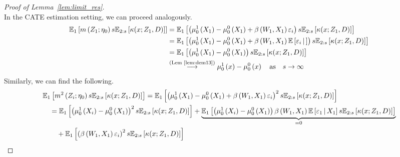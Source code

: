 \begin{proof}[Proof of Lemma~\ref{lem:limit_res}]
\begin{equation}
	\end{equation}
	In the CATE estimation setting, we can proceed analogously.
	\begin{equation}
		\begin{aligned}
			\mathbb{E}_{1}\left[m\left(Z_{1}; \eta_{0}\right) s \mathbb{E}_{2:s}\left[\kappa(x; Z_1, D)\right]\right]
			 & = \mathbb{E}_{1}\left[\left(\mu_{0}^{1}\left(X_{1}\right) - \mu_{0}^{0}\left(X_{1}\right) + \beta\left(W_{1}, X_{1}\right)\varepsilon_{i}\right) s \mathbb{E}_{2:s}\left[\kappa(x; Z_1, D)\right]\right]                                \\
			 & = \mathbb{E}_{1}\left[\left(\mu_{0}^{1}\left(X_{1}\right) - \mu_{0}^{0}\left(X_{1}\right) + \beta\left(W_{1}, X_{1}\right)\mathbb{E}\left[\varepsilon_{i} \, \middle| \, \right]\right) s \mathbb{E}_{2:s}\left[\kappa(x; Z_1, D)\right]\right] \\
			 & = \mathbb{E}_{1}\left[\left(\mu_{0}^{1}\left(X_{1}\right) - \mu_{0}^{0}\left(X_{1}\right)\right) s \mathbb{E}_{2:s}\left[\kappa(x; Z_1, D)\right]\right]                                                                                \\
			 & \overset{\text{(Lem~\ref{lem:dem13})}}{\longrightarrow} \mu_{0}^{1}\left(x\right) - \mu_{0}^{0}\left(x\right)
			\quad \text{as} \quad s \rightarrow \infty
		\end{aligned}
	\end{equation}
	Similarly, we can find the following.
	\begin{equation}
		\begin{aligned}
			 & \E_{1}\left[m^2\left(Z_{i}; \eta_{0}\right) s \E_{2:s}\left[\kappa(x; Z_1, D)\right]\right]
			= \E_{1}\left[\left(\mu_{0}^{1}\left(X_{1}\right) - \mu_{0}^{0}\left(X_{1}\right) + \beta\left(W_{1}, X_{1}\right)\varepsilon_{i}\right)^2 s \E_{2:s}\left[\kappa(x; Z_1, D)\right]\right]                                                                                             \\
			 & \quad = \E_{1}\left[\left(\mu_{0}^{1}\left(X_{i}\right) - \mu_{0}^{0}\left(X_{1}\right)\right)^2 s \E_{2:s}\left[\kappa(x; Z_1, D)\right]\right]
			+ \underbrace{\E_{1}\left[\left(\mu_{0}^{1}\left(X_{i}\right) - \mu_{0}^{0}\left(X_{1}\right)\right)\beta\left(W_{1}, X_{1}\right)\E\left[\varepsilon_{1} \, \middle| \, X_1\right] s \E_{2:s}\left[\kappa(x; Z_1, D)\right]\right]}_{=0}                                              \\
			 & \quad \quad + \E_{1}\left[\left(\beta\left(W_{1}, X_{1}\right)\varepsilon_{i}\right)^2 s \E_{2:s}\left[\kappa(x; Z_1, D)\right]\right]                                                                                                                                  \\

\end{aligned}
\end{equation}
\end{proof}
